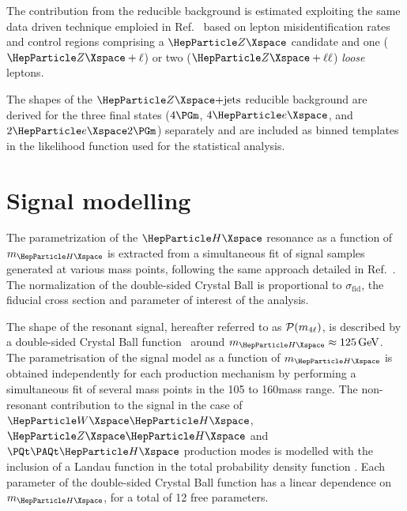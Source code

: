 The contribution from the reducible background is estimated exploiting the same data driven technique emploied in Ref.~\cite{CMSHIG19001} based on lepton misidentification rates and control regions comprising a $\PZ$ candidate and one ($\PZ+\ell$) or two ($\PZ+\ell\ell$) \textit{loose} leptons.

The shapes of the $\PZ\text{+jets}$ reducible background are derived for the three final states ($4\Pgm$, $4\Pe$, and $2\Pe 2\Pgm$) separately and are included as binned templates in the likelihood function used for the statistical analysis.

\section{Signal modelling}
\label{sec:signal}

The parametrization of the $\PH$ resonance as a function of $\mH$ is extracted from a simultaneous fit of signal samples generated at various mass points, following the same approach detailed in Ref.~\cite{CMSHIG19001}.
The normalization of the double-sided Crystal Ball is proportional to $\sigma_{\mathrm{fid}}$, the fiducial cross section and parameter of interest of the analysis.

The shape of the \PH resonant signal, hereafter referred to as $\mathcal{P}(m_{4\ell})$, is described by a double-sided Crystal Ball function~\cite{Oreglia:1980cs} around $\mH \approx 125\GeV$.
The parametrisation of the signal model as a function of $\mH$ is obtained independently for each production mechanism by performing a simultaneous fit of several mass points  in the 105 to 160\GeV mass range.
The non-resonant contribution to the signal in the case of $\WH$, $\ZH$ and $\ttH$ production modes is modelled with the inclusion of a  Landau function in the total probability density function . 
Each parameter of the double-sided Crystal Ball function has a linear dependence on $\mH$, for a total of 12 free parameters.


